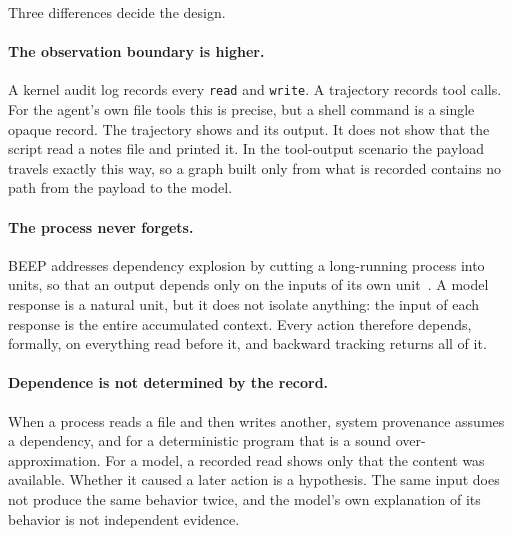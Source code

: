 Three differences decide the design.

\paragraph{The observation boundary is higher.}
A kernel audit log records every \texttt{read} and \texttt{write}.
A trajectory records tool calls.
For the agent's own file tools this is precise, but a shell command is a single opaque record.
The trajectory shows  and its output.
It does not show that the script read a notes file and printed it.
In the tool-output scenario the payload travels exactly this way, so a graph built only from what is recorded contains no path from the payload to the model.

\paragraph{The process never forgets.}
BEEP addresses dependency explosion by cutting a long-running process into units, so that an output depends only on the inputs of its own unit~\cite{beep}.
A model response is a natural unit, but it does not isolate anything: the input of each response is the entire accumulated context.
Every action therefore depends, formally, on everything read before it, and backward tracking returns all of it.

\paragraph{Dependence is not determined by the record.}
When a process reads a file and then writes another, system provenance assumes a dependency, and for a deterministic program that is a sound over-approximation.
For a model, a recorded read shows only that the content was available.
Whether it caused a later action is a hypothesis.
The same input does not produce the same behavior twice, and the model's own explanation of its behavior is not independent evidence.
